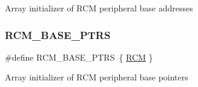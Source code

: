 Array initializer of R\+CM peripheral base addresses \mbox{\label{group___r_c_m___peripheral___access___layer_gad8549fec4a09b0b485983beadfc3a5fb}} 
\subsubsection{\texorpdfstring{RCM\_BASE\_PTRS}{RCM\_BASE\_PTRS}}
{\footnotesize\ttfamily \#define R\+C\+M\+\_\+\+B\+A\+S\+E\+\_\+\+P\+T\+RS~\{ \mbox{\hyperlink{group___r_c_m___peripheral___access___layer_gaa5c5e6af3b266654facbd52caa0b8874}{R\+CM}} \}}

Array initializer of R\+CM peripheral base pointers 